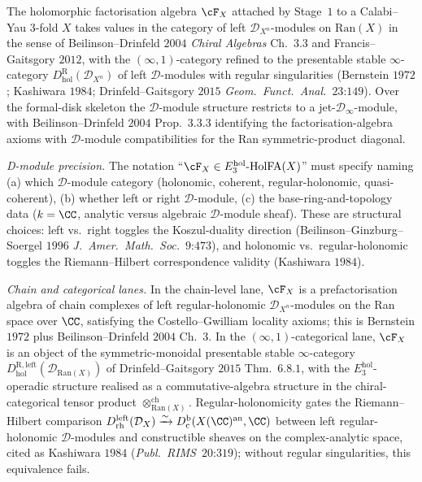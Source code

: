 \begin{theorem}
\label{wn:thm:third-pass-hCS-D-module}

The holomorphic factorisation algebra $\cF_X$ attached by Stage~$1$
to a Calabi--Yau $3$-fold $X$ takes values in the category of
left $\mathcal{D}_{X^n}$-modules on $\mathrm{Ran}(X)$ in the
sense of Beilinson--Drinfeld $2004$ \emph{Chiral Algebras} Ch.~$3.3$
and Francis--Gaitsgory $2012$, with the $(\infty,1)$-category refined
to the presentable stable $\infty$-category
$D_{\mathrm{hol}}^{\mathrm{R}}(\mathcal{D}_{X^n})$ of left
$\mathcal{D}$-modules with regular singularities (Bernstein
$1972$; Kashiwara $1984$; Drinfeld--Gaitsgory $2015$
\emph{Geom.~Funct.~Anal.}~$23$:$149$). Over the formal-disk skeleton
the $\mathcal{D}$-module structure restricts to a
jet-$\mathcal{D}_{\infty}$-module, with Beilinson--Drinfeld $2004$
Prop.~$3.3.3$ identifying the factorisation-algebra axioms with
$\mathcal{D}$-module compatibilities for the Ran symmetric-product
diagonal.

\emph{D-module precision.} The notation
``$\cF_X \in E_3^{\mathrm{hol}}\text{-}\mathrm{HolFA}(X)$'' must specify
naming (a) which $\mathcal{D}$-module category (holonomic, coherent,
regular-holonomic, quasi-coherent), (b) whether left or right
$\mathcal{D}$-module, (c) the base-ring-and-topology data
($k = \CC$, analytic versus algebraic $\mathcal{D}$-module sheaf).
These are structural choices: left vs.\ right toggles the Koszul-duality
direction (Beilinson--Ginzburg--Soergel $1996$
\emph{J.~Amer.~Math.~Soc.}~$9$:$473$), and holonomic vs.\
regular-holonomic toggles the Riemann--Hilbert correspondence
validity (Kashiwara $1984$).

\emph{Chain and categorical lanes.} In the chain-level lane,
$\cF_X$ is a prefactorisation algebra of chain complexes of
left regular-holonomic $\mathcal{D}_{X^n}$-modules on the Ran
space over $\CC$, satisfying the Costello--Gwilliam locality axioms;
this is Bernstein $1972$ plus Beilinson--Drinfeld $2004$ Ch.~$3$. In
the $(\infty,1)$-categorical lane, $\cF_X$ is an object of the
symmetric-monoidal presentable stable $\infty$-category
$D_{\mathrm{hol}}^{\mathrm{R, left}}(\mathcal{D}_{\mathrm{Ran}(X)})$
of Drinfeld--Gaitsgory $2015$ Thm.~$6.8.1$, with the $E_3^{\mathrm{hol}}
$-operadic structure realised as a commutative-algebra structure in
the chiral-categorical tensor product
$\otimes^{\mathrm{ch}}_{\mathrm{Ran}(X)}$. Regular-holonomicity gates
the Riemann--Hilbert comparison
$D_{\mathrm{rh}}^{\mathrm{left}}(\mathcal{D}_X)
\xrightarrow{\sim} D^{\mathrm{b}}_{\mathrm{c}}(X(\CC)^{\mathrm{an}}, \CC)$
between left regular-holonomic $\mathcal{D}$-modules and constructible
sheaves on the complex-analytic space, cited as Kashiwara $1984$
(\emph{Publ.~RIMS}~$20$:$319$); without regular singularities, this
equivalence fails.
\end{theorem}

